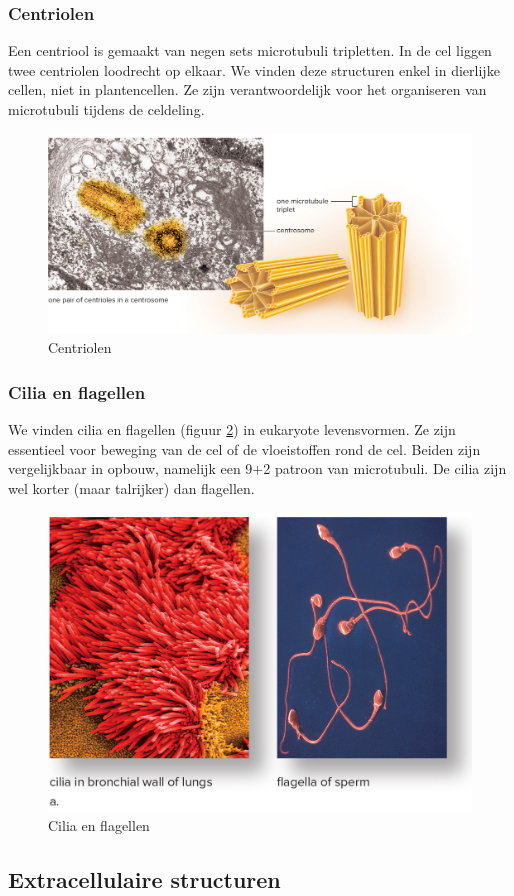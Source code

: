 \documentclass[a4paper,kul]{kulakarticle} %
\begin{document}
\subsubsection{Centriolen}
Een centriool is gemaakt van negen sets microtubuli tripletten. In de cel liggen twee centriolen loodrecht op elkaar. We vinden deze structuren enkel in dierlijke cellen, niet in plantencellen. Ze zijn verantwoordelijk voor het organiseren van microtubuli tijdens de celdeling. 
\begin{figure}[h]
	\centering
	\includegraphics[width=0.5\linewidth]{Centriolen}
	\caption[Centriolen]{Centriolen}
	\label{fig:centriolen}
\end{figure}

\subsubsection{Cilia en flagellen}
We vinden cilia en flagellen (figuur \ref{fig:ciliaenflagellen}) in eukaryote levensvormen. Ze zijn essentieel voor beweging van de cel of de vloeistoffen rond de cel. Beiden zijn vergelijkbaar in opbouw, namelijk een 9+2 patroon van microtubuli. De cilia zijn wel korter (maar talrijker) dan flagellen.
\begin{figure}[h]
	\centering
	\includegraphics[width=0.7\linewidth]{Cilia_en_Flagellen}
	\caption[Cilia en flagellen]{Cilia en flagellen}
	\label{fig:ciliaenflagellen}
\end{figure}

\subsection{Extracellulaire structuren}
\end{document}
